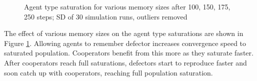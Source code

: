 \documentclass[english]{article}
\begin{document}
\begin{figure}[!ht]
  \centering
  \caption{Agent type saturation for various memory sizes after 100, 150, 175, 250 steps; SD of 30 simulation runs, outliers removed}
  \label{fig:agent_sat/memory_size}
\end{figure}

The effect of various memory sizes on the agent type saturations are shown in Figure \ref{fig:agent_sat/memory_size}.
Allowing agents to remember defector increases convergence speed to saturated population.
Cooperators benefit from this more as they saturate faster.
After cooperators reach full saturations, defectors start to reproduce faster and soon catch up with cooperators, reaching full population saturation.
\end{document}
